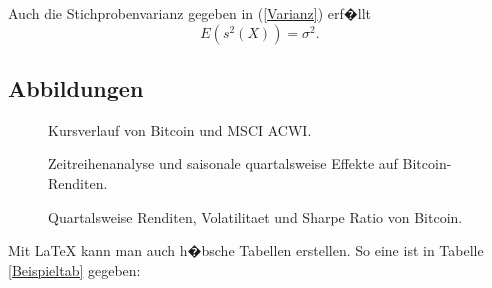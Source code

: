 \documentclass[a4paper,12pt]{article}
\begin{document}
Auch die Stichprobenvarianz gegeben in (\ref{Varianz}) erf�llt
\[
E(s^2(X))=\sigma^2.
\]

\subsection{Abbildungen}


\begin{figure}[!ht] 
\caption{Kursverlauf von Bitcoin und MSCI ACWI.} 
\label{Abb1} 
\end{figure}


\begin{figure}[!ht] 
\caption{Zeitreihenanalyse und saisonale quartalsweise Effekte auf Bitcoin-Renditen.} 
\label{Abb2} 
\end{figure}


\begin{figure}[!ht] 
\caption{Quartalsweise Renditen, Volatilitaet und Sharpe Ratio von Bitcoin.} 
\label{Abb3} 
\end{figure}


Mit LaTeX kann man auch h�bsche Tabellen erstellen. So eine ist in Tabelle \ref{Beispieltab} gegeben:
\end{document}
